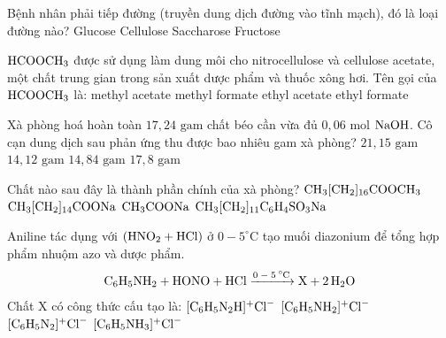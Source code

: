 \documentclass[12pt,a4paper]{article}
\begin{document}
\begin{ex}
Bệnh nhân phải tiếp đường (truyền dung dịch đường vào tĩnh mạch), đó là loại đường nào?
\choice
{\True Glucose}
{Cellulose}
{Saccharose}
{Fructose}
\end{ex}

\begin{ex}
$\ce{HCOOCH3}$ được sử dụng làm dung môi cho nitrocellulose và cellulose acetate, một chất trung gian trong sản xuất dược phẩm và thuốc xông hơi. Tên gọi của $\ce{HCOOCH3}$ là:
\choice
{methyl acetate}
{\True methyl formate}
{ethyl acetate}
{ethyl formate}
\end{ex}

\begin{ex}
Xà phòng hoá hoàn toàn $17{,}24\text{ gam}$ chất béo cần vừa đủ $0{,}06\text{ mol}$ $\ce{NaOH}$. Cô cạn dung dịch sau phản ứng thu được bao nhiêu gam xà phòng?
\choice
{$21{,}15\text{ gam}$}
{$14{,}12\text{ gam}$}
{$14{,}84\text{ gam}$}
{\True $17{,}8\text{ gam}$}
\end{ex}

\begin{ex}
Chất nào sau đây là thành phần chính của xà phòng?
\choice
{$\ce{CH3[CH2]_{16}COOCH3}$}
{\True $\ce{CH3[CH2]_{14}COONa}$}
{$\ce{CH3COONa}$}
{$\ce{CH3[CH2]_{11}C6H4SO3Na}$}
\end{ex}

\begin{ex}
Aniline tác dụng với $(\ce{HNO2 + HCl})$ ở $0 - 5^\circ\text{C}$ tạo muối diazonium để tổng hợp phẩm nhuộm azo và dược phẩm.
\[\ce{C6H5NH2 + HONO + HCl ->[0 - 5^\circ\text{C}] X + 2H2O}\]
Chất X có công thức cấu tạo là:
\choice
{$[\ce{C6H5N2H}]^+\ce{Cl^-}$}
{$[\ce{C6H5NH2}]^+\ce{Cl^-}$}
{\True $[\ce{C6H5N2}]^+\ce{Cl^-}$}
{$[\ce{C6H5NH3}]^+\ce{Cl^-}$}
\end{ex}
\end{document}
